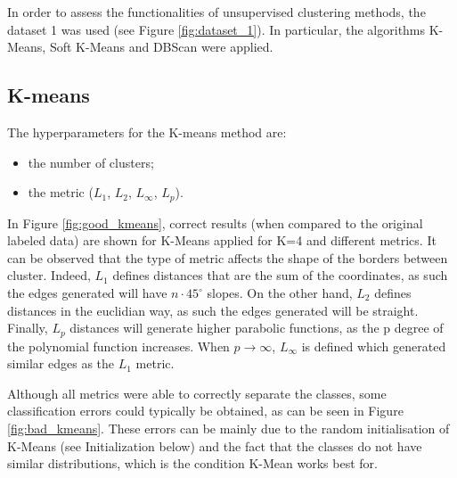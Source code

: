 \documentclass[a4paper,10pt]{article}
\begin{document}

In order to assess the functionalities of unsupervised clustering methods, the dataset 1 was used (see Figure \ref{fig:dataset_1}). In particular, the algorithms K-Means, Soft K-Means and DBScan were applied.

\subsection{K-means}

The hyperparameters for the K-means method are:
\begin{itemize}
\item the number of clusters;
\item the metric ($L_1$, $L_2$, $L_{\infty}$, $L_p$).
\end{itemize}

In Figure \ref{fig:good_kmeans}, correct results (when compared to the original labeled data) are shown for K-Means applied for K=4 and different metrics. It can be observed that the type of metric affects the shape of the borders between cluster. Indeed, $L_1$ defines distances that are the sum of the coordinates, as such the edges generated will have $n\cdot 45^{\circ}$ slopes. On the other hand, $L_2$ defines distances in the euclidian way, as such the edges generated will be straight. Finally, $L_p$ distances will generate higher parabolic functions, as the p degree of the polynomial function increases. When $p\rightarrow\infty$, $L_{\infty}$ is defined which generated similar edges as the $L_1$ metric. 

Although all metrics were able to correctly separate the classes, some classification errors could typically be obtained, as can be seen in Figure \ref{fig:bad_kmeans}. These errors can be mainly due to the random initialisation of K-Means (see Initialization below) and the fact that the classes do not have similar distributions, which is the condition K-Mean works best for. 
\end{document}
